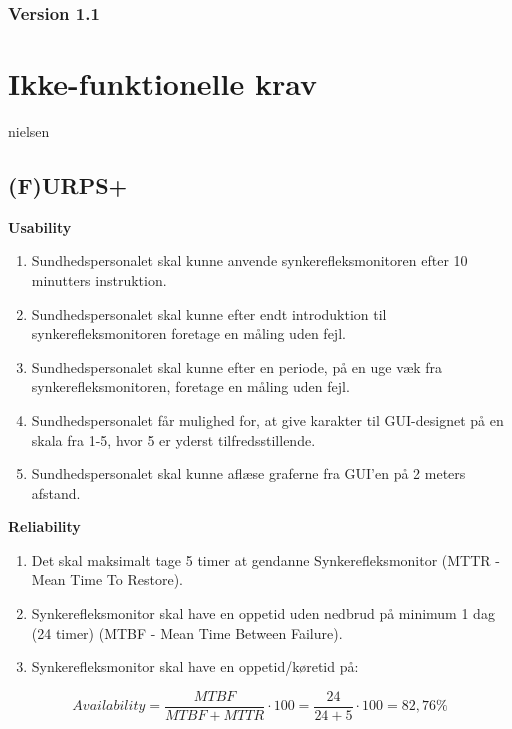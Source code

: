 \subsubsection{Version 1.1}

\section{Ikke-funktionelle krav}






nielsen \cite{NielsenUsabilityUsability}

\subsection{(F)URPS+}

\textbf{Usability}
\begin{enumerate}
\item Sundhedspersonalet skal kunne anvende synkerefleksmonitoren efter 10 minutters instruktion. 
\item Sundhedspersonalet skal kunne efter endt introduktion til synkerefleksmonitoren foretage en måling uden fejl.
\item Sundhedspersonalet skal kunne efter en periode, på en uge væk fra synkerefleksmonitoren, foretage en måling uden fejl.
\item Sundhedspersonalet får mulighed for, at give karakter til GUI-designet på en skala fra 1-5, hvor 5 er yderst tilfredsstillende.
\item Sundhedspersonalet skal kunne aflæse graferne fra GUI'en på 2 meters afstand. 
\end{enumerate}
                                                                                                
\textbf{Reliability}
\begin{enumerate}[resume]
\item Det skal maksimalt tage 5 timer at gendanne Synkerefleksmonitor (MTTR - Mean Time To Restore).
\item Synkerefleksmonitor skal have en oppetid uden nedbrud på minimum 1 dag (24 timer) (MTBF - Mean Time Between Failure).  
\item Synkerefleksmonitor skal have en oppetid/køretid på: 
\end{enumerate}


\begin{equation}
Availability = \frac{MTBF}{MTBF+MTTR}\cdot100 = \frac{24}{24+5}\cdot100 = 82,76 \%
\end{equation}

